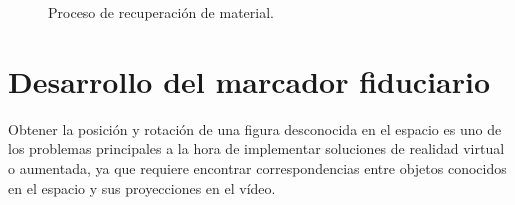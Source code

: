 \begin{figure}%
    \centering
    \qquad
    \caption{Proceso de recuperación de material.}%
    \label{fig:3dslier}%
\end{figure}

\section{Desarrollo del marcador fiduciario}
Obtener la posición y rotación de una figura desconocida en el espacio es uno de los problemas principales a la hora de implementar soluciones de realidad virtual o aumentada, ya que requiere encontrar correspondencias entre objetos conocidos en el espacio y sus proyecciones en el vídeo.

